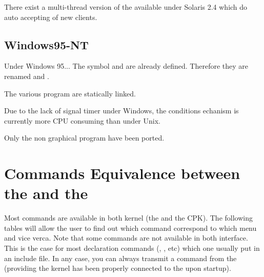 There exist a multi-thread version of the \OPRSS{} available under Solaris 2.4
which do auto accepting of new \CPK{} clients.

\section{Windows95-NT}

Under Windows 95... The  symbol  and 
are already defined. Therefore they are renamed  and
.

The various program are statically linked.

Due to the lack of signal timer under Windows, the conditions echanism is
currently more CPU consuming than under Unix.

Only the non graphical program have been ported.

\chapter{Commands Equivalence between the \CPK{} and the \XPK{}}

Most commands are available in both kernel (the \XPK{} and the CPK{}). The
following tables will allow the user to find out which command correspond to
which menu and vice verca. Note that some commands are not available in both
interface. This is the case for most declaration commands (,
, etc) which one usually put in an include file. In any case, you
can always transmit a command from the \OPRSS{} (providing the kernel has
been properly connected to the \OPRSS{} upon startup).


